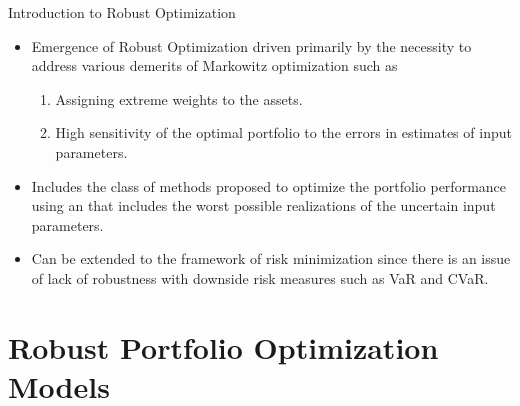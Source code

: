 \documentclass{beamer}
\begin{document}
\begin{frame}{Introduction to Robust Optimization}{}
\begin{itemize}
   \item{Emergence of Robust Optimization driven primarily by the necessity to address various demerits of Markowitz \cite{mark1} optimization such as}
   \begin{enumerate}
       \item Assigning extreme weights to the assets.
       \item High sensitivity of the optimal portfolio to the errors in estimates of input parameters.
   \end{enumerate}
   \item{Includes the class of methods proposed to optimize the portfolio performance using an  that includes the worst possible realizations of the uncertain input parameters.}
   \item{Can be extended to the framework of risk minimization since there is an issue of lack of robustness with downside risk measures such as VaR and CVaR.}
   
    
\end{itemize}
\end{frame}




\section{Robust Portfolio Optimization Models}
\end{document}
